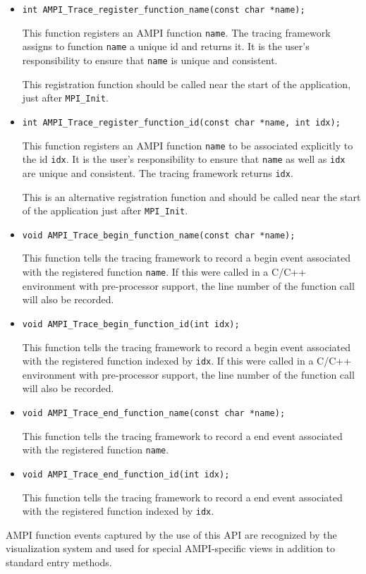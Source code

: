 \begin{itemize}
\item
\begin{verbatim}
int AMPI_Trace_register_function_name(const char *name);
\end{verbatim}
This function registers an AMPI function {\tt name}. The tracing
framework assigns to function {\tt name} a unique id and returns
it. It is the user's responsibility to ensure that {\tt name} is
unique and consistent.

This registration function should be called near the start of the
application, just after {\tt MPI\_Init}.

\item
\begin{verbatim}
int AMPI_Trace_register_function_id(const char *name, int idx);
\end{verbatim}
This function registers an AMPI function {\tt name} to be associated
explicitly to the id {\tt idx}. It is the user's responsibility to
ensure that {\tt name} as well as {\tt idx} are unique and consistent.
The tracing framework returns {\tt idx}.

This is an alternative registration function and should be called near
the start of the application just after {\tt MPI\_Init}.

\item
\begin{verbatim}
void AMPI_Trace_begin_function_name(const char *name);
\end{verbatim}
This function tells the tracing framework to record a begin event
associated with the registered function {\tt name}. If this were called
in a C/C++ environment with pre-processor support, the line number of
the function call will also be recorded.

\item
\begin{verbatim}
void AMPI_Trace_begin_function_id(int idx);
\end{verbatim}
This function tells the tracing framework to record a begin event
associated with the registered function indexed by {\tt idx}. If this were
called in a C/C++ environment with pre-processor support, the line number
of the function call will also be recorded.

\item
\begin{verbatim}
void AMPI_Trace_end_function_name(const char *name);
\end{verbatim}
This function tells the tracing framework to record a end event
associated with the registered function {\tt name}.

\item
\begin{verbatim}
void AMPI_Trace_end_function_id(int idx);
\end{verbatim}
This function tells the tracing framework to record a end event
associated with the registered function indexed by {\tt idx}.

\end{itemize}

AMPI function events captured by the use of this API are recognized by
the visualization system and used for special AMPI-specific views in
addition to standard \charmpp{} entry methods.
